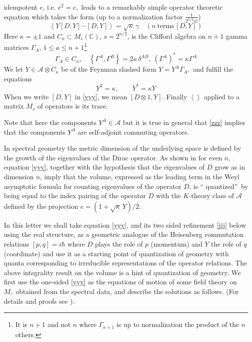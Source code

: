 \documentclass
[twocolumn,prl,unsortedaddress,superscriptaddress,showpacs]{revtex4}%
\begin{document}
idempotent $e$, i.e. $e^{2}=e,$ leads to a remarkably simple operator
theoretic equation which takes the form (up to a normalization factor
$\frac{1}{2^{n/2}n!}$)
\begin{equation}
\left\langle Y\left[  D,Y\right]  \cdots\left[  D,Y\right]  \right\rangle
=\sqrt{\kappa}\,\gamma\quad\left(  n\mathrm{\ terms\,}\left[  D,Y\right]
\right)  \label{yyy}%
\end{equation}
Here $\kappa=\pm1$ and $C_{\kappa}\subset M_{s}(\mathbb{C})$, $s=2^{n/2}$, is
the Clifford algebra on $n+1$ gamma matrices $\Gamma_{A}$, $1\leq a\leq
n+1$\footnote{It is $n+1$ and not $n$ where $\Gamma_{n+1}$ is up to
normalization the product of the $n$ others.}
\[
\Gamma_{A}\in C_{\kappa},\quad\left\{  \Gamma^{A},\Gamma^{B}\right\}
=2\kappa\,\delta^{AB},\ (\Gamma^{A})^{\ast}=\kappa\Gamma^{A}%
\]
We let $Y\in\mathcal{A}\otimes C_{\kappa}$ be of the Feynman slashed form
$Y=Y^{A}\Gamma_{A},$ and fulfill the equations
\begin{equation}
Y^{2}=\kappa,\qquad Y^{\ast}=\kappa Y \label{zzz}%
\end{equation}
When we write $[D,Y]$ in \eqref{yyy}, we mean $[D\otimes1,Y]$. Finally
$\left\langle {}\right\rangle $ applied to a matrix $M_{s}$ of operators is
its trace.

Note that here the components $Y^{A}\in\mathcal{A}$ but it is true in general
that \eqref{zzz} implies that the components $Y^{A}$ are self-adjoint
commuting operators.

In spectral geometry the metric dimension of the underlying space is defined
by the growth of the eigenvalues of the Dirac operator. As shown in
\cite{Connes} for even $n,$ equation \eqref{yyy}, together with the hypothesis
that the eigenvalues of $D$ grow as in dimension $n$, imply that the volume,
expressed as the leading term in the Weyl asymptotic formula for counting
eigenvalues of the operator $D$, is \textquotedblleft
quantized\textquotedblright\ by being equal to the index pairing of the
operator $D$ with the $K$-theory class of $\mathcal{A}$ defined by the
projection $e=(1+\sqrt{\kappa}\,Y)/2$.

In this letter we shall take equation \eqref{yyy}, and its two sided
refinement \eqref{jjj} below using the real structure, as a geometric analogue
of the Heisenberg commutation relations $[p,q]=i\hbar$ where $D$ plays the
role of $p$ (momentum) and $Y$ the role of $q$ (coordinate) and use it as a
starting point of quantization of geometry with quanta corresponding to
irreducible representations of the operator relations. The above integrality
result on the volume is a hint of quantization of geometry. We first use the
one-sided \eqref{yyy} as the equations of motion of some field theory on $M,$
obtained from the spectral data, and describe the solutions as follows. (For
details and proofs see \cite{CCM1,CCM2}).
\end{document}
